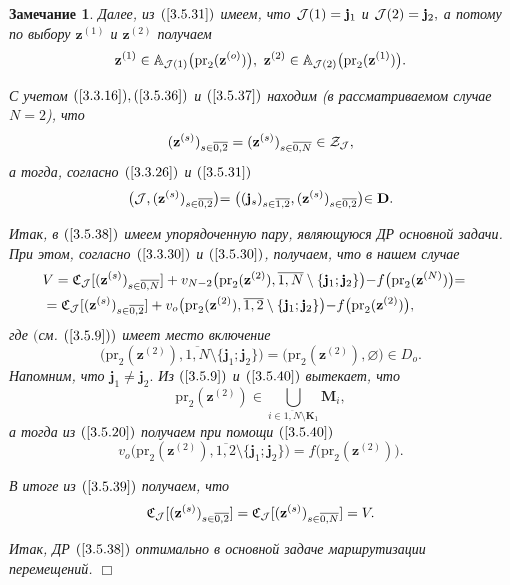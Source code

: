 \documentclass[11pt,twoside,openany]{report}
\newcommand{\bfn}{\begin{equation}}
\newcommand{\efn}{\end{equation}}
\newcommand{\ov}{\overline}
\newcounter{theo}
\newcounter{zam}
\newtheorem{zam}{Замечание}[section]
\newcommand{\sm}{\setminus}
\newcommand{\cj}{{\cal J}}
\newcommand{\cz}{{\cal Z}}
\newcommand{\bba}{{\mathbb A}}
\newcommand{\emp}{\varnothing}
\begin{document}
{\begin{zam}
Далее, из $(\ref{3.5.31})$ имеем, что
$\cj(1) = \mathbf{j}_1$ и $\cj(2) = \mathbf{j}_2,$
а потому по выбору
$\mathbf{z}^{(1)}$ и $\mathbf{z}^{(2)}$
получаем
\bfn
  \label{3.5.37}
  \mathbf{z}^{(1)} \in \bba_{\cj(1)} \bigl(\mathrm{pr}_2(\mathbf{z}^{(o)})\bigl),
  \ \mathbf{z}^{(2)} \in \bba_{\cj(2)} \bigl(\mathrm{pr}_2(\mathbf{z}^{(1)})\bigl)
  .
\efn

С учетом $(\ref{3.3.16}), (\ref{3.5.36})$ и $(\ref{3.5.37})$
находим
(в рассматриваемом случае $N = 2$),
что
$$
  (\mathbf{z}^{(s)})_{s\in\ov{0,2}} = (\mathbf{z}^{(s)})_{s\in\ov{0,N}} \in \cz_\cj
  ,
$$
а тогда, согласно
$(\ref{3.3.26})$ и $(\ref{3.5.31})$
\bfn
  \label{3.5.38}
  \bigl(\cj,(\mathbf{z}^{(s)})_{s\in\ov{0,2}} \bigl) =
  \bigl((\mathbf{j}_s)_{s\in\ov{1,2}},(\mathbf{z}^{(s)})_{s\in\ov{0,2}} \bigl) \in \mathbf{D}
  .
\efn

Итак, в $(\ref{3.5.38})$
имеем упорядоченную пару, являющуюся ДР основной задачи.
При этом,
согласно
$(\ref{3.3.30})$ и $(\ref{3.5.30})$,
получаем, что в нашем случае
\begin{eqnarray}
  &V = \mathfrak{C}_\cj[(\mathbf{z}^{(s)})_{s\in\ov{0,N}}] +
  v_{N-2}\bigl(\mathrm{pr}_2(\mathbf{z}^{(2)}),\ov{1,N}\sm\{\mathbf{j}_1;\mathbf{j}_2\}\bigl) -
  f\bigl(\mathrm{pr}_2(\mathbf{z}^{(N)})\bigl) =
  &\nonumber\\
  &= \mathfrak{C}_\cj[(\mathbf{z}^{(s)})_{s\in\ov{0,2}}] + v_o\bigl(\mathrm{pr}_2(\mathbf{z}^{(2)}),
  \ov{1,2}\sm \{\mathbf{j}_1;\mathbf{j}_2\}\bigl) - f\bigl(\mathrm{pr}_2(\mathbf{z}^{(2)})\bigl)
  ,
  &
  \label{3.5.39}
\end{eqnarray}
где $($см. $(\ref{3.5.9}))$
имеет место включение
\bfn
  \label{3.5.40}
  \bigl(\mathrm{pr}_2(\mathbf{z}^{(2)}),\ov{1,N}\sm\{\mathbf{j}_1;\mathbf{j}_2\}\bigl) =
  \bigl(\mathrm{pr}_2(\mathbf{z}^{(2)}),\emp\bigl) \in D_o
  .
\efn
Напомним, что
$\mathbf{j}_1\neq \mathbf{j}_2.$
Из $(\ref{3.5.9})$
и
$(\ref{3.5.40})$ вытекает, что
$$
  \mathrm{pr}_2(\mathbf{z}^{(2)})\in \bigcup\limits_{i\in\ov{1,N}\sm \mathbf{K}_1}\mathbf{M}_i
  ,
$$
а тогда из $(\ref{3.5.20})$ получаем
при помощи
$(\ref{3.5.40})$
$$
  v_o\bigl(\mathrm{pr}_2(\mathbf{z}^{(2)}),\ov{1,2}\sm\{\mathbf{j}_1;\mathbf{j}_2\}\bigl) =
  f\bigl(\mathrm{pr}_2(\mathbf{z}^{(2)})\bigl)
  .
$$

В итоге из $(\ref{3.5.39})$
получаем, что
\bfn
  \label{3.5.40`}
  \mathfrak{C}_\cj[(\mathbf{z}^{(s)})_{s\in\ov{0,2}}]=
  \mathfrak{C}_\cj[(\mathbf{z}^{(s)})_{s\in\ov{0,N}}] = V
  .
\efn

Итак, ДР $(\ref{3.5.38})$
оптимально в основной задаче маршрутизации перемещений.
\hfill $\Box$
\end{zam}

}
\end{document}
